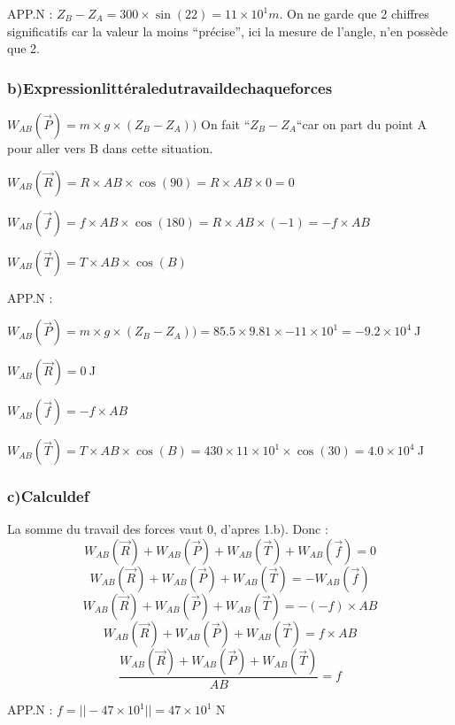 \documentclass[a4paper,twoside,10pt,french]{scrartcl}
\begin{document}
APP.N : $Z_B - Z_A = 300 \times \sin(22) = 11 \times 10^1 m$. On ne garde que 2 chiffres significatifs car la valeur la moins ``précise'', ici la mesure de l'angle, n'en possède que 2.
\subsubsection{b)Expression\:littérale\:du\:travail\:de\:chaque\:forces}
$W_{AB} (\overrightarrow{P}) = m \times g \times (Z_B - Z_A))$ On fait ``$Z_B - Z_A$``car on part du point A pour aller vers B dans cette situation.

$W_{AB} (\overrightarrow{R}) = R \times AB \times \cos(90) = R \times AB \times 0 = 0$

$W_{AB} (\overrightarrow{f}) = f \times AB \times \cos(180) = R \times AB \times (-1) = - f \times AB$

$W_{AB} (\overrightarrow{T}) = T \times AB \times \cos(B)$

APP.N :

$W_{AB} (\overrightarrow{P}) = m \times g \times (Z_B - Z_A)) = 85.5 \times 9.81 \times -11\times 10^1 = -9.2 \times 10^4\:$J

$W_{AB} (\overrightarrow{R}) = 0\:$J

$W_{AB} (\overrightarrow{f}) = - f \times AB$

$W_{AB} (\overrightarrow{T}) = T \times AB \times \cos(B) = 430 \times 11\times 10^1 \times \cos(30)= 4.0 \times 10^4\:$J

\subsubsection{c)Calcul\:de\:f}
La somme du travail des forces vaut 0, d'apres 1.b). Donc :
$$W_{AB} (\overrightarrow{R}) + W_{AB} (\overrightarrow{P}) + W_{AB} (\overrightarrow{T}) + W_{AB} (\overrightarrow{f}) = 0$$
$$W_{AB} (\overrightarrow{R}) + W_{AB} (\overrightarrow{P}) + W_{AB} (\overrightarrow{T}) = - W_{AB} (\overrightarrow{f})$$
$$W_{AB} (\overrightarrow{R}) + W_{AB} (\overrightarrow{P}) + W_{AB} (\overrightarrow{T}) = - (-f) \times AB$$
$$W_{AB} (\overrightarrow{R}) + W_{AB} (\overrightarrow{P}) + W_{AB} (\overrightarrow{T}) = f \times AB$$
$$\frac{W_{AB} (\overrightarrow{R}) + W_{AB} (\overrightarrow{P}) + W_{AB} (\overrightarrow{T})}{AB} = f$$

APP.N : $f = ||-47 \times 10^1|| = 47 \times 10^1$\: N
\end{document}
